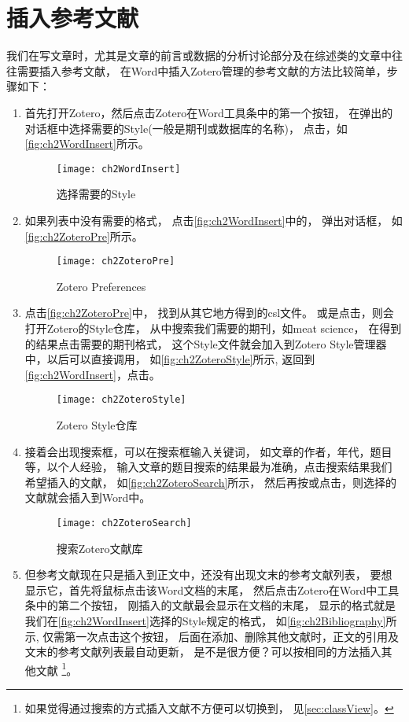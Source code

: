 \documentclass[theorem=false,mathfont=none,openany,sub3section]{easybook}
\begin{document}
\section{插入参考文献}\label{sec:insertRef}
我们在写文章时，尤其是文章的前言或数据的分析讨论部分及在综述类的文章中往往需要插入参考文献，
在Word中插入Zotero管理的参考文献的方法比较简单，步骤如下：
\begin{enumerate}
	\item
	首先打开Zotero，然后点击Zotero在Word工具条中的第一个按钮，
	在弹出的对话框中选择需要的Style(一般是期刊或数据库的名称)，
	点击，如\autoref{fig:ch2WordInsert}所示。
	\begin{figure}[htbp]
		\centering
		\texttt{[image: ch2WordInsert]}
		\caption{选择需要的Style}
		\label{fig:ch2WordInsert}
	\end{figure}
	\item
	如果列表中没有需要的格式\label{tag:notyle}，
	点击\autoref{fig:ch2WordInsert}中的，
	弹出对话框，
	如\autoref{fig:ch2ZoteroPre}所示。
	\begin{figure}[htbp]
		\centering
		\texttt{[image: ch2ZoteroPre]}
		\caption{Zotero Preferences}
		\label{fig:ch2ZoteroPre}
	\end{figure}
	\item
	点击\autoref{fig:ch2ZoteroPre}中\menu{+}，
	找到从其它地方得到的csl文件。
	或是点击，则会打开Zotero的Style仓库，
	从中搜索我们需要的期刊，如meat science，
	在得到的结果点击需要的期刊格式，
	这个Style文件就会加入到Zotero Style管理器中，以后可以直接调用，
	如\autoref{fig:ch2ZoteroStyle}所示,
	返回到\autoref{fig:ch2WordInsert}，点击。
	\begin{figure}[htbp]
		\centering
		\texttt{[image: ch2ZoteroStyle]}
		\caption{Zotero Style仓库}
		\label{fig:ch2ZoteroStyle}
	\end{figure}
	\item
	接着会出现搜索框，可以在搜索框输入关键词，
	如文章的作者，年代，题目等，以个人经验，
	输入文章的题目搜索的结果最为准确，点击搜索结果我们希望插入的文献，
	如\autoref{fig:ch2ZoteroSearch}所示，
	然后再按或点击\arrowkeyright，则选择的文献就会插入到Word中。
	\begin{figure}[htbp]
		\centering
		\texttt{[image: ch2ZoteroSearch]}
		\caption{搜索Zotero文献库}
		\label{fig:ch2ZoteroSearch}
	\end{figure}
	\item
	但参考文献现在只是插入到正文中，还没有出现文末的参考文献列表，
	要想显示它，首先将鼠标点击该Word文档的末尾，
	然后点击Zotero在Word中工具条中的第二个按钮，
	刚插入的文献最会显示在文档的末尾，
	显示的格式就是我们在\autoref{fig:ch2WordInsert}选择的Style规定的格式，
	如\autoref{fig:ch2Bibliography}所示,
	仅需第一次点击这个按钮，
	后面在添加、删除其他文献时，正文的引用及文末的参考文献列表最自动更新，
	是不是很方便？可以按相同的方法插入其他文献
	\footnote{如果觉得通过搜索的方式插入文献不方便可以切换到，
		见\cref{sec:classView}。}。
	

\end{enumerate}
\end{document}
